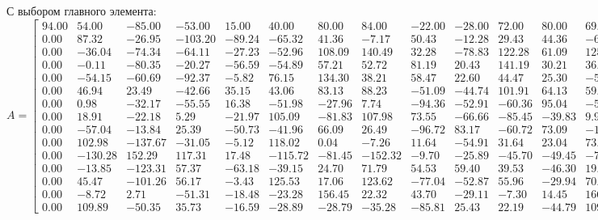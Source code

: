 \documentclass[a4paper, 12pt]{article}
\begin{document}
\normalsize С выбором главного элемента:
\tiny
\[
A = 
\left[{
	\begin{array}{rrrrrrrrrrrrrrr}
	94.00 &   54.00 &  -85.00 &  -53.00 &   15.00 &   40.00 &   80.00 &   84.00 &  -22.00 &  -28.00 &   72.00 &   80.00 &   69.00 &  -44.00 &  -89.00	\\
	 0.00 &   87.32 &  -26.95 & -103.20 &  -89.24 &  -65.32 &   41.36 &   -7.17 &   50.43 &  -12.28 &   29.43 &   44.36 &  -68.93 &  -85.15 &   86.59	\\
	 0.00 &  -36.04 &  -74.34 &  -64.11 &  -27.23 &  -52.96 &  108.09 &  140.49 &   32.28 &  -78.83 &  122.28 &   61.09 &  125.72 &   45.55 &   10.26	\\
	 0.00 &   -0.11 &  -80.35 &  -20.27 &  -56.59 &  -54.89 &   57.21 &   52.72 &   81.19 &   20.43 &  141.19 &   30.21 &   36.31 &   65.38 &   19.14	\\
	 0.00 &  -54.15 &  -60.69 &  -92.37 &   -5.82 &   76.15 &  134.30 &   38.21 &   58.47 &   22.60 &   44.47 &   25.30 &  -55.97 &  -25.06 &  -93.61	\\
	 0.00 &   46.94 &   23.49 &  -42.66 &   35.15 &   43.06 &   83.13 &   88.23 &  -51.09 &  -44.74 &  101.91 &   64.13 &   59.09 &  -50.17 &   53.38	\\
	 0.00 &    0.98 &  -32.17 &  -55.55 &   16.38 &  -51.98 &  -27.96 &    7.74 &  -94.36 &  -52.91 &  -60.36 &   95.04 &  -54.64 &   -7.72 &   54.13	\\
	 0.00 &   18.91 &  -22.18 &    5.29 &  -21.97 &  105.09 &  -81.83 &  107.98 &   73.55 &  -66.66 &  -85.45 &  -39.83 &    9.95 &  -36.89 &  -87.99	\\
	 0.00 &  -57.04 &  -13.84 &   25.39 &  -50.73 &  -41.96 &   66.09 &   26.49 &  -96.72 &   83.17 &  -60.72 &   73.09 &  -18.78 &  -99.45 &  -34.24	\\
	 0.00 &  102.98 & -137.67 &  -31.05 &   -5.12 &  118.02 &    0.04 &   -7.26 &   11.64 &  -54.91 &   31.64 &   23.04 &   73.86 &  -39.72 &  -86.37	\\
	 0.00 & -130.28 &  152.29 &  117.31 &   17.48 & -115.72 &  -81.45 & -152.32 &   -9.70 &  -25.89 &  -45.70 &  -49.45 &  -79.80 &  -22.40 &   27.16	\\
	 0.00 &  -13.85 & -123.31 &   57.37 &  -63.18 &  -39.15 &   24.70 &   71.79 &   54.53 &   59.40 &   39.53 &  -46.30 &   19.97 &   48.06 &   16.61	\\
	 0.00 &   45.47 & -101.26 &   56.17 &   -3.43 &  125.53 &   17.06 &  123.62 &  -77.04 &  -52.87 &   55.96 &  -29.94 &   70.04 &   43.91 &  -37.81	\\
	 0.00 &   -8.72 &    2.71 &  -51.31 &  -18.48 &  -23.28 &  156.45 &   22.32 &   43.70 &  -29.11 &   -7.30 &   14.45 &  166.80 &  -57.60 &  -33.16	\\
	 0.00 &  109.89 &  -50.35 &   35.73 &  -16.59 &  -28.89 &  -28.79 &  -35.28 &  -85.81 &   25.43 &   22.19 &  -44.79 &  109.31 &   16.38 &  -43.86
	\end{array} 
}\right]\]
\end{document}
